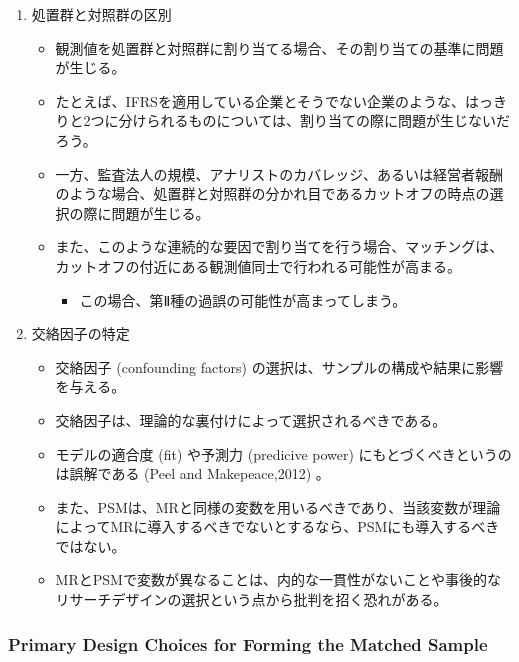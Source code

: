 \begin{enumerate}
 \item 処置群と対照群の区別
   \begin{itemize}
    \item 観測値を処置群と対照群に割り当てる場合、その割り当ての基準に問題が生じる。
    \item たとえば、IFRSを適用している企業とそうでない企業のような、はっきりと2つに分けられるものについては、割り当ての際に問題が生じないだろう。
    \item 一方、監査法人の規模、アナリストのカバレッジ、あるいは経営者報酬のような場合、処置群と対照群の分かれ目であるカットオフの時点の選択の際に問題が生じる。
    \item また、このような連続的な要因で割り当てを行う場合、マッチングは、カットオフの付近にある観測値同士で行われる可能性が高まる。
          \begin{itemize}
           \item この場合、第Ⅱ種の過誤の可能性が高まってしまう。
          \end{itemize}
   \end{itemize}
 \item 交絡因子の特定
   \begin{itemize}
    \item 交絡因子 (confounding factors) の選択は、サンプルの構成や結果に影響を与える。
    \item 交絡因子は、理論的な裏付けによって選択されるべきである。
    \item モデルの適合度 (fit) や予測力 (predicive power) にもとづくべきというのは誤解である (Peel and Makepeace,2012) 。
    \item また、PSMは、MRと同様の変数を用いるべきであり、当該変数が理論によってMRに導入するべきでないとするなら、PSMにも導入するべきではない。
    \item MRとPSMで変数が異なることは、内的な一貫性がないことや事後的なリサーチデザインの選択という点から批判を招く恐れがある。
   \end{itemize}
\end{enumerate}

\subsubsection*{Primary Design Choices for Forming the Matched Sample}

